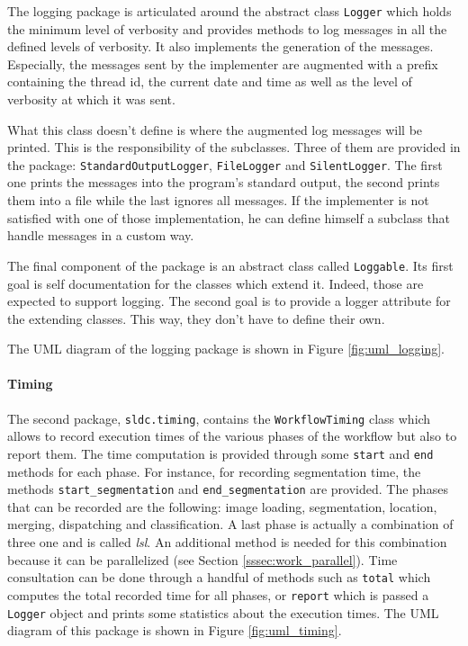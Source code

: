 The logging package is articulated around the abstract class \texttt{Logger} which holds the minimum level of verbosity and provides methods to log messages in all the defined levels of verbosity. It also implements the generation of the messages. Especially, the messages sent by the implementer are augmented with a prefix containing the thread id, the current date and time as well as the level of verbosity at which it was sent. 

What this class doesn't define is where the augmented log messages will be printed. This is the responsibility of the subclasses. Three of them are provided in the package: \texttt{StandardOutputLogger}, \texttt{FileLogger} and \texttt{SilentLogger}. The first one prints the messages into the program's standard output, the second prints them into a file while the last ignores all messages. If the implementer is not satisfied with one of those implementation, he can define himself a subclass that handle messages in a custom way. 

The final component of the package is an abstract class called \texttt{Loggable}. Its first goal is self documentation for the classes which extend it. Indeed, those are expected to support logging. The second goal is to provide a logger attribute for the extending classes. This way, they don't have to define their own. 

The UML diagram of the logging package is shown in Figure \ref{fig:uml_logging}.

\paragraph{Timing} The second package, \texttt{sldc.timing}, contains the \texttt{WorkflowTiming} class which allows to record execution times of the various phases of the workflow but also to report them. The time computation is provided through some \texttt{start} and \texttt{end} methods for each phase. For instance, for recording segmentation time, the methods \texttt{start\_segmentation} and \texttt{end\_segmentation} are provided. The phases that can be recorded are the following: image loading, segmentation, location, merging, dispatching and classification. A last phase is actually a combination of three one and is called \textit{lsl}. An additional method is needed for this combination because it can be parallelized (see Section \ref{sssec:work_parallel}). Time consultation can be done through a handful of methods such as \texttt{total} which computes the total recorded time for all phases, or \texttt{report} which is passed a \texttt{Logger} object and prints some statistics about the execution times. The UML diagram of this package is shown in Figure \ref{fig:uml_timing}.

